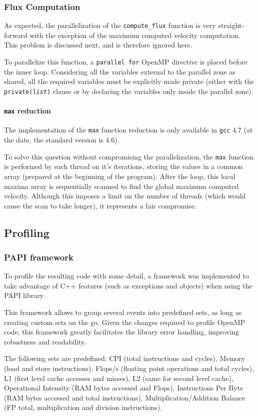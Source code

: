 \documentclass[9pt,twocolumn]{scrartcl}
\newcommand{\paragraphh}[1]{\paragraph{#1\hfill}\hfill

}
\begin{document}
\subsubsection{Flux Computation}
As expected, the parallelization of the \texttt{compute\_flux} function is very straight-forward with the exception of the maximum computed velocity computation. This problem is discussed next, and is therefore ignored here.

To parallelize this function, a \texttt{parallel for} OpenMP directive is placed before the inner loop. Considering all the variables external to the parallel zone as shared, all the required variables must be explicitly made private (either with the \texttt{private({\textit{list}})} clause or by declaring the variables only inside the parallel zone).

\paragraphh{\texttt{max} reduction}
The implementation of the \texttt{max} function reduction is only available in \texttt{gcc} 4.7 (at the date, the standard version is 4.6).

To solve this question without compromising the parallelization, the \texttt{max} function is performed by each thread on it's iterations, storing the values in a common array (prepared at the beginning of the program). After the loop, this local maxima array is sequentially scanned to find the global maximum computed velocity. Although this imposes a limit on the number of threads (which would cause the scan to take longer), it represents a fair compromise.

\subsection{Profiling}
\subsubsection{PAPI framework}%
To profile the resulting code with some detail, a framework was implemented to take advantage of C++ features (such as exceptions and objects) when using the PAPI library.

This framework allows to group several events into predefined sets, as long as creating custom sets on the go. Given the changes required to profile OpenMP code, this framework greatly facilitates the library error handling, improving robustness and readability.

The following sets are predefined: CPI (total instructions and cycles), Memory (load and store instructions), Flops/s (floating point operations and total cycles), L1 (first level cache accesses and misses), L2 (same for second level cache), Operational Intensity (RAM bytes accessed and Flops), Instructions Per Byte (RAM bytes accessed and total instructions), Multiplication/Addition Balance (FP total, multiplication and division instructions).
\end{document}
